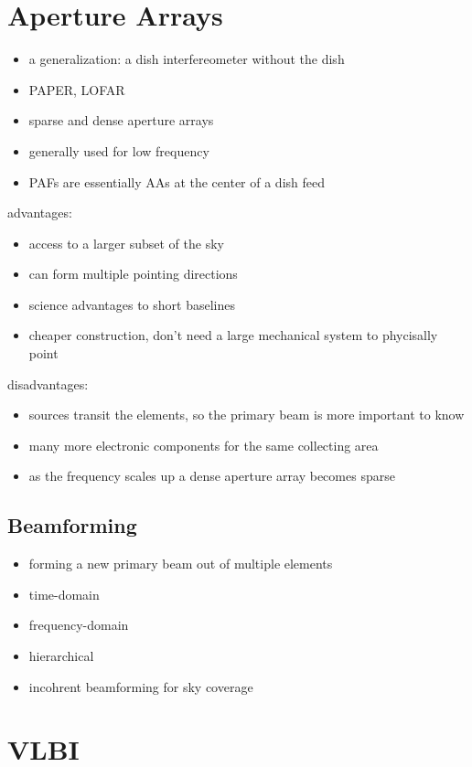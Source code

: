 \documentclass[usenatbib,usegraphicx]{article}
\begin{document}
\section{Aperture Arrays}

\begin{itemize}
\item a generalization: a dish interfereometer without the dish
\item PAPER, LOFAR
\item sparse and dense aperture arrays
\item generally used for low frequency
\item PAFs are essentially AAs at the center of a dish feed
\end{itemize}

advantages:
\begin{itemize}
\item access to a larger subset of the sky
\item can form multiple pointing directions
\item science advantages to short baselines
\item cheaper construction, don't need a large mechanical system to phycisally point
\end{itemize}

disadvantages:
\begin{itemize}
\item sources transit the elements, so the primary beam is more important to know
\item many more electronic components for the same collecting area
\item as the frequency scales up a dense aperture array becomes sparse
\end{itemize}

\subsection{Beamforming}

\begin{itemize}
\item forming a new primary beam out of multiple elements
\item time-domain
\item frequency-domain
\item hierarchical
\item incohrent beamforming for sky coverage
\end{itemize}

\section{VLBI}
\end{document}
